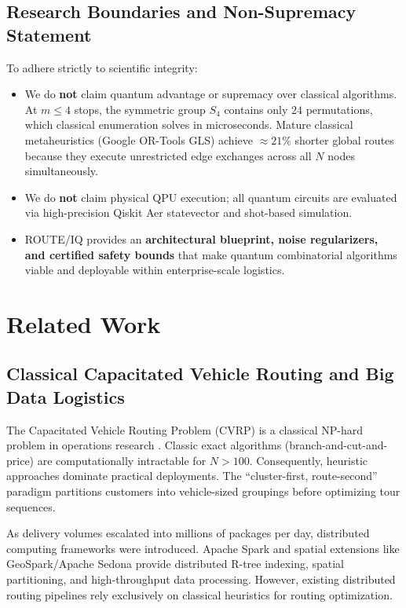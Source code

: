 \documentclass[journal,10pt]{IEEEtran}
\begin{document}
\subsection{Research Boundaries and Non-Supremacy Statement}
To adhere strictly to scientific integrity:
\begin{itemize}
    \item We do \textbf{not} claim quantum advantage or supremacy over classical algorithms. At $m \le 4$ stops, the symmetric group $S_4$ contains only $24$ permutations, which classical enumeration solves in microseconds. Mature classical metaheuristics (Google OR-Tools GLS) achieve $\approx 21\%$ shorter global routes because they execute unrestricted edge exchanges across all $N$ nodes simultaneously.
    \item We do \textbf{not} claim physical QPU execution; all quantum circuits are evaluated via high-precision Qiskit Aer statevector and shot-based simulation.
    \item ROUTE/IQ provides an \textbf{architectural blueprint, noise regularizers, and certified safety bounds} that make quantum combinatorial algorithms viable and deployable within enterprise-scale logistics.
\end{itemize}

\section{Related Work}
\subsection{Classical Capacitated Vehicle Routing and Big Data Logistics}
The Capacitated Vehicle Routing Problem (CVRP) is a classical NP-hard problem in operations research \cite{toth2014vehicle}. Classic exact algorithms (branch-and-cut-and-price) are computationally intractable for $N > 100$. Consequently, heuristic approaches dominate practical deployments. The ``cluster-first, route-second'' paradigm \cite{clarke1964scheduling} partitions customers into vehicle-sized groupings before optimizing tour sequences.

As delivery volumes escalated into millions of packages per day, distributed computing frameworks were introduced. Apache Spark \cite{zaharia2016apache} and spatial extensions like GeoSpark/Apache Sedona \cite{yu2015geospark} provide distributed R-tree indexing, spatial partitioning, and high-throughput data processing. However, existing distributed routing pipelines rely exclusively on classical heuristics for routing optimization.
\end{document}
